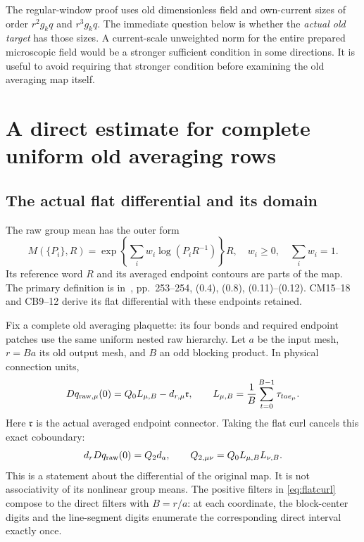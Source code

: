 \documentclass[11pt,letterpaper]{article}
\theoremstyle{plain}
\theoremstyle{remark}\newtheorem{remark}[theorem]{Scope}
\begin{document}
The regular-window proof uses old dimensionless field and own-current sizes
of order $r^2g_kq$ and $r^3g_kq$. The immediate question below is whether
the \emph{actual old target} has those sizes. A current-scale unweighted norm
for the entire prepared microscopic field would be a stronger sufficient
condition in some directions. It is useful to avoid requiring that stronger
condition before examining the old averaging map itself.

\section{A direct estimate for complete uniform old averaging rows}
\label{sec:average}

\subsection{The actual flat differential and its domain}

The raw group mean has the outer form
\begin{equation}
 M(\{P_i\},R)
 =\exp\left\{\sum_i w_i\log(P_iR^{-1})\right\}R,
 \quad w_i\ge0,\quad\sum_iw_i=1.
 \label{eq:rawmean}
\end{equation}
Its reference word $R$ and its averaged endpoint contours are parts of the
map. The primary definition is in~\cite{sf1}, pp.\ 253--254,
(0.4), (0.8), (0.11)--(0.12). CM15--18 and CB9--12 derive its flat
differential with these endpoints retained.

Fix a complete old averaging plaquette: its four bonds and required endpoint
patches use the same uniform nested raw hierarchy. Let $a$ be the input mesh,
$r=Ba$ its old output mesh, and $B$ an odd blocking product. In physical
connection units,
\begin{equation}
 Dq_{{\rm raw},\mu}(0)=Q_0L_{\mu,B}-d_{r,\mu}\mathfrak r,
 \qquad L_{\mu,B}=\frac1B\sum_{t=0}^{B-1}\tau_{tae_\mu}.
\end{equation}
Here $\mathfrak r$ is the actual averaged endpoint connector. Taking the flat
curl cancels this exact coboundary:
\begin{equation}
 d_rDq_{\rm raw}(0)=Q_2d_a,
 \qquad Q_{2,\mu\nu}=Q_0L_{\mu,B}L_{\nu,B}.
 \label{eq:flatcurl}
\end{equation}
This is a statement about the differential of the original map. It is not
associativity of its nonlinear group means. The positive filters in
\eqref{eq:flatcurl} compose to the direct filters with $B=r/a$: at each
coordinate, the block-center digits and the line-segment digits enumerate
the corresponding direct interval exactly once.
\end{document}
